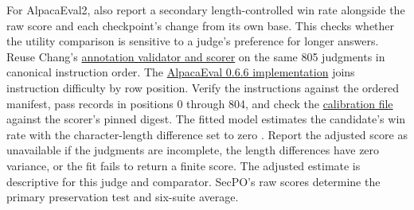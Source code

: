 \documentclass[11pt]{article}
\begin{document}
\begin{itemize}
For AlpacaEval2, also report a secondary length-controlled win rate alongside the raw score and each checkpoint's change from its own base. This checks whether the utility comparison is sensitive to a judge's preference for longer answers. Reuse Chang's \href{https://github.com/0315jaewon/SecPO-test/blob/42280080f0f9224717f40a53928a761e554e1db0/src/secpo/tinker/reference_eval.py#L282-L319}{annotation validator and scorer} on the same 805 judgments in canonical instruction order. The \href{https://github.com/tatsu-lab/alpaca_eval/blob/cd543a149df89434d8a54582c0151c0b945c3d20/src/alpaca_eval/metrics/glm_winrate.py}{AlpacaEval 0.6.6 implementation} joins instruction difficulty by row position. Verify the instructions against the ordered manifest, pass records in positions 0 through 804, and check the \href{https://huggingface.co/datasets/tatsu-lab/alpaca_eval/blob/2edc6fad8be6b14ea7230aabfd08188da6b8b814/df_gamed.csv}{calibration file} against the scorer's pinned digest. The fitted model estimates the candidate's win rate with the character-length difference set to zero \cite{dubois2024length}. Report the adjusted score as unavailable if the judgments are incomplete, the length differences have zero variance, or the fit fails to return a finite score. The adjusted estimate is descriptive for this judge and comparator. SecPO's raw scores determine the primary preservation test and six-suite average.


\end{itemize}
\end{document}

